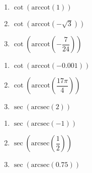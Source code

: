 \documentclass{ximera}
\begin{document}
\begin{multicols}{3}

\begin{enumerate}

\setcounter{enumi}{\value{HW}}

\item $\cot\left(\text{arccot}\left(1\right)\right)$ 
\item $\cot\left(\text{arccot}\left(-\sqrt{3}\right)\right)$ 
\item $\cot\left(\text{arccot}\left(-\dfrac{7}{24}\right)\right)$

\setcounter{HW}{\value{enumi}}

\end{enumerate}

\end{multicols}

\begin{multicols}{3}

\begin{enumerate}

\setcounter{enumi}{\value{HW}}

\item $\cot\left(\text{arccot}\left(-0.001\right)\right)$ 
\item $\cot\left(\text{arccot}\left( \dfrac{17\pi}{4} \right)\right)$
\item $\sec\left(\text{arcsec}\left(2\right)\right)$ 

\setcounter{HW}{\value{enumi}}

\end{enumerate}

\end{multicols}

\begin{multicols}{3}

\begin{enumerate}

\setcounter{enumi}{\value{HW}}

\item $\sec\left(\text{arcsec}\left(-1\right)\right)$ 
\item $\sec\left(\text{arcsec}\left(\dfrac{1}{2}\right)\right)$
\item $\sec\left(\text{arcsec}\left(0.75\right)\right)$ 

\setcounter{HW}{\value{enumi}}

\end{enumerate}

\end{multicols}
\end{document}
